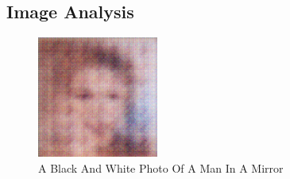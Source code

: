 \documentclass{article}%
\begin{document}
%
\subsection{Image Analysis}%
\label{subsec:ImageAnalysis}%


\begin{figure}[h!]%
\centering%
\includegraphics[width=150px]{500_fake_images/samples_5_153.png}%
\caption{A Black And White Photo Of A Man In A Mirror}%
\end{figure}

%
\end{document}
